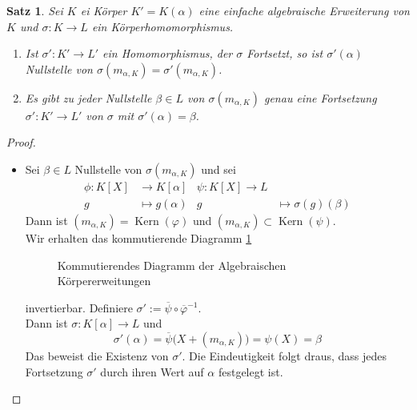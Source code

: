 \documentclass[10pt,a4paper]{article}
\newcommand{\al}{\ensuremath{\alpha}}
\newcommand{\ol}[1]{\overline{#1}}
\newcommand{\Kern}{\operatorname{Kern}}
\theoremstyle{plain}
\newtheorem{satz}[theorem]{Satz}
\theoremstyle{definition}
\theoremstyle{remark}
\begin{document}
 	\begin{satz}\label{satz:nsterhaltung}
 		Sei $K$ ei Körper $K'=K(\al)$ eine einfache algebraische Erweiterung von $K$ und $\sigma:K\to L$ ein Körperhomomorphismus.
 		\begin{enumerate}
 			\item Ist $\sigma':K'\to L'$ ein Homomorphismus, der $\sigma$ Fortsetzt, so ist $\sigma'(\al)$ Nullstelle von $\sigma(m_{\al,K})=\sigma'(m_{\al,K})$.
 			\item Es gibt zu jeder Nullstelle $\beta\in L$ von $\sigma(m_{\al,K})$ genau eine Fortsetzung $\sigma':K'\to L'$ von $\sigma$ mit $\sigma'(\al)=\beta$.
 		\end{enumerate}
 	\end{satz}
 	\begin{proof}
 		\begin{itemize}
 			\setcounter{enumi}{1}
 			\item Sei $\beta\in L$ Nullstelle von $\sigma(m_{\al,K})$ und sei
 			\begin{align*}
 			\phi:K[X]&\to K[\al]&\psi:K[X]\to L\\
 			g&\mapsto g(\al)&g&\mapsto \sigma(g)(\beta)
 			\end{align*}
 			Dann ist $(m_{\al,K})=\Kern(\varphi)$ und $(m_{\al,K})\subset\Kern(\psi)$.\\
 			Wir erhalten das kommutierende Diagramm \ref{fig:cdiag-alg-einf-KE}
 			\begin{figure}
 				\centering
 			\caption{Kommutierendes Diagramm der Algebraischen Körpererweitungen}
 			\label{fig:cdiag-alg-einf-KE}
 			\end{figure}
 			invertierbar. Definiere $\sigma':=\ol{\psi}\circ\ol{\varphi}^{-1}$.\\
 			Dann ist $\sigma:K[\al]\to L$ und \[\sigma'(\al)=\ol{\psi}\big(X+(m_{\al,K})\big)=\psi(X)=\beta\]
 			Das beweist die Existenz von $\sigma'$. Die Eindeutigkeit folgt draus, dass jedes Fortsetzung $\sigma'$ durch ihren Wert auf $\al$ festgelegt ist.
 		\end{itemize}
 	\end{proof}
 
\end{document}

